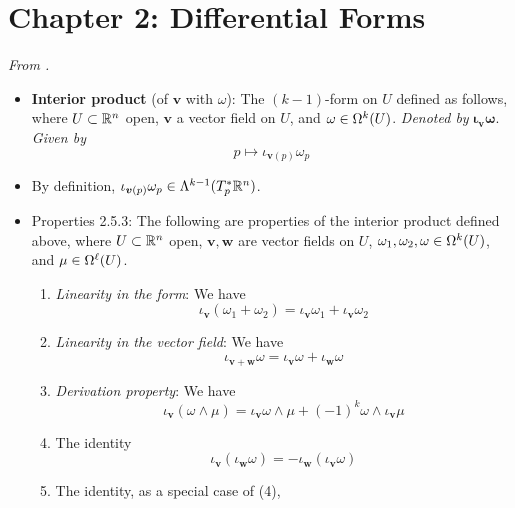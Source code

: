 \documentclass[../notes.tex]{subfiles}
\begin{document}
\section{Chapter 2: Differential Forms}
\emph{From \textcite{bib:DifferentialForms}.}
\begin{itemize}
    \item {}\textbf{Interior product} (of $\bm{v}$ with $\omega$): The $(k-1)$-form on $U$ defined as follows, where $U\subset\R^n$ open, $\bm{v}$ a vector field on $U$, and $\omega\in\ome[k]{U}$. \emph{Denoted by} $\bm{\iota_{\pmb{v}}\omega}$. \emph{Given by}
    \begin{equation*}
        p \mapsto \iota_{\bm{v}(p)}\omega_p
    \end{equation*}
    \item By definition, $\iota_{\bm{v}(p)}\omega_p\in\lam[k-1]{T_p^*\R^n}$.
    \item {}Properties 2.5.3: The following are properties of the interior product defined above, where $U\subset\R^n$ open, $\bm{v},\bm{w}$ are vector fields on $U$, $\omega_1,\omega_2,\omega\in\ome[k]{U}$, and $\mu\in\ome[\ell]{U}$.
    \begin{enumerate}
        \item \emph{Linearity in the form}: We have
        \begin{equation*}
            \iota_{\bm{v}}(\omega_1+\omega_2) = \iota_{\bm{v}}\omega_1+\iota_{\bm{v}}\omega_2
        \end{equation*}
        \item \emph{Linearity in the vector field}: We have
        \begin{equation*}
            \iota_{\bm{v}+\bm{w}}\omega = \iota_{\bm{v}}\omega+\iota_{\bm{w}}\omega
        \end{equation*}
        \item \emph{Derivation property}: We have
        \begin{equation*}
            \iota_{\bm{v}}(\omega\wedge\mu) = \iota_{\bm{v}}\omega\wedge\mu+(-1)^k\omega\wedge\iota_{\bm{v}}\mu
        \end{equation*}
        \item The identity
        \begin{equation*}
            \iota_{\bm{v}}(\iota_{\bm{w}}\omega) = -\iota_{\bm{w}}(\iota_{\bm{v}}\omega)
        \end{equation*}
        \item The identity, as a special case of (4),
        \begin{equation*}

\end{equation*}
\end{enumerate}
\end{itemize}
\end{document}
